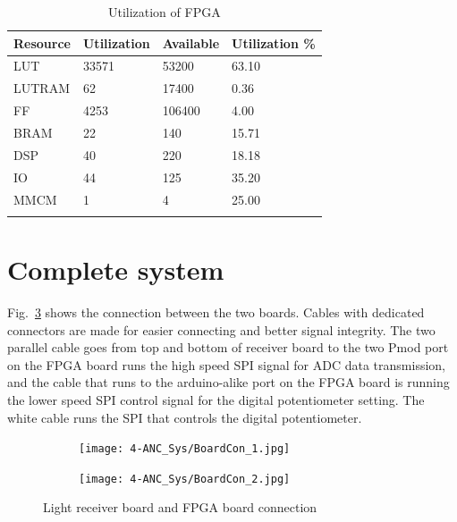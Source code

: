 \begin{longtable}[c]{|l|l|l|l|}
\hline
\textbf{Resource} & \textbf{Utilization} & \textbf{Available} & \textbf{Utilization \%} \\ \hline
\endhead
%
\rowcolor[HTML]{FFFFFF} 
LUT & 33571 & 53200 & 63.10 \\ \hline
\rowcolor[HTML]{FFFFFF} 
LUTRAM & 62 & 17400 & 0.36 \\ \hline
\rowcolor[HTML]{FFFFFF} 
FF & 4253 & 106400 & 4.00 \\ \hline
\rowcolor[HTML]{FFFFFF} 
BRAM & 22 & 140 & 15.71 \\ \hline
\rowcolor[HTML]{FFFFFF} 
DSP & 40 & 220 & 18.18 \\ \hline
\rowcolor[HTML]{FFFFFF} 
IO & 44 & 125 & 35.20 \\ \hline
\rowcolor[HTML]{FFFFFF} 
MMCM & 1 & 4 & 25.00 \\ \hline
\caption{Utilization of FPGA}
\label{tab_FPGAUtilSimple}\\
\end{longtable}

\section{Complete system}

Fig.~\ref{fig_BoardCon} shows the connection between the two boards.  Cables with dedicated connectors are made for easier connecting and better signal integrity.  The two parallel cable goes from top and bottom of receiver board to the two Pmod port on the FPGA board runs the high speed SPI signal for ADC data transmission, and the cable that runs to the arduino-alike port on the FPGA board is running the lower speed SPI control signal for the digital potentiometer setting.  The white cable runs the SPI that controls the digital potentiometer.



\begin{figure}[h]
\centering
\begin{subfigure}{.5\textwidth}
  \centering
  \texttt{[image: 4-ANC\_Sys/BoardCon\_1.jpg]}
  \caption{}
  \label{fig_BoardCon_1}
\end{subfigure}%
\begin{subfigure}{.5\textwidth}
  \centering
  \texttt{[image: 4-ANC\_Sys/BoardCon\_2.jpg]}
  \caption{}
  \label{fig_BoardCon_2}
\end{subfigure}
\caption{Light receiver board and FPGA board connection}
\label{fig_BoardCon}
\end{figure}

